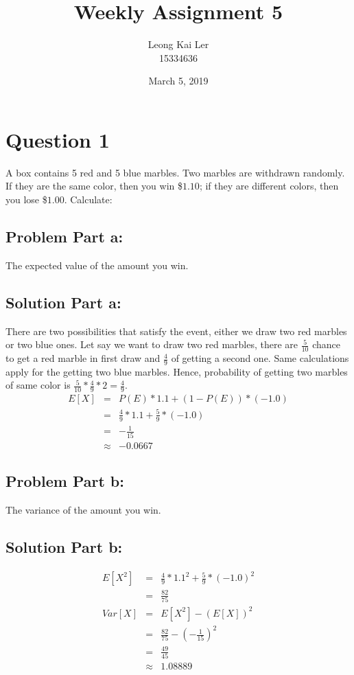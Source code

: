 \documentclass[12pt]{article}%
\makeatletter
\renewcommand{\maketitle}{\bgroup\setlength{\parindent}{0pt}
\begin{flushleft}
  \textbf{\@title}

  \@author
  \@date
\end{flushleft}\egroup
}
\makeatother
\begin{document}
\title{Weekly Assignment 5}
\author{Leong Kai Ler \\ 15334636 \\   }
\date{March 5, 2019}
\maketitle

\section*{Question 1}
A box contains 5 red and 5 blue marbles. Two marbles are withdrawn randomly. If they are the same color, then you win \$$1.10$; if they are different colors, then you lose \$$1.00$. Calculate:
\subsection*{Problem Part a:}
The expected value of the amount you win.
\subsection*{Solution Part a:}
There are two possibilities that satisfy the event, either we draw two red marbles or two blue ones. Let say we want to draw two red marbles, there are $\frac{5}{10}$ chance to get a red marble in first draw and $\frac{4}{9}$ of getting a second one. Same calculations apply for the getting two blue marbles. Hence, probability of getting two marbles of same color is $\frac{5}{10}*\frac{4}{9}*2=\frac{4}{9}$.
\begin{eqnarray*}
E[X] & = & P(E) * 1.1 + (1-P(E))*(-1.0) \\
     & = & \frac{4}{9} * 1.1 + \frac{5}{9} * (-1.0) \\
     & = & -\frac{1}{15} \\
     & \approx & -0.0667
\end{eqnarray*}
\subsection*{Problem Part b:}
The variance of the amount you win.
\subsection*{Solution Part b:}
\begin{eqnarray*}
E[X^2] & = & \frac{4}{9} * 1.1^2 + \frac{5}{9} * (-1.0)^2 \\
	   & = & \frac{82}{75}\\
Var[X] & = & E[X^2] - (E[X])^2 \\
	   & = & \frac{82}{75} - (-\frac{1}{15})^2 \\
	   & = & \frac{49}{45} \\
	   & \approx & 1.08889
\end{eqnarray*}
\end{document}
